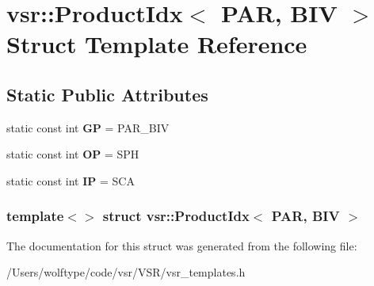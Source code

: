 \hypertarget{structvsr_1_1_product_idx_3_01_p_a_r_00_01_b_i_v_01_4}{\section{vsr\-:\-:Product\-Idx$<$ P\-A\-R, B\-I\-V $>$ Struct Template Reference}
\label{structvsr_1_1_product_idx_3_01_p_a_r_00_01_b_i_v_01_4}
}
\subsection*{Static Public Attributes}
\begin{DoxyCompactItemize}
\item 
\hypertarget{structvsr_1_1_product_idx_3_01_p_a_r_00_01_b_i_v_01_4_afad88fd347926194531077b879e67901}{static const int {\bfseries G\-P} = P\-A\-R\-\_\-\-B\-I\-V}\label{structvsr_1_1_product_idx_3_01_p_a_r_00_01_b_i_v_01_4_afad88fd347926194531077b879e67901}

\item 
\hypertarget{structvsr_1_1_product_idx_3_01_p_a_r_00_01_b_i_v_01_4_a21b4ef192774e806d08707426a80eb07}{static const int {\bfseries O\-P} = S\-P\-H}\label{structvsr_1_1_product_idx_3_01_p_a_r_00_01_b_i_v_01_4_a21b4ef192774e806d08707426a80eb07}

\item 
\hypertarget{structvsr_1_1_product_idx_3_01_p_a_r_00_01_b_i_v_01_4_a2157d9f949e2d5369cd8aa4b728452ba}{static const int {\bfseries I\-P} = S\-C\-A}\label{structvsr_1_1_product_idx_3_01_p_a_r_00_01_b_i_v_01_4_a2157d9f949e2d5369cd8aa4b728452ba}

\end{DoxyCompactItemize}
\subsubsection*{template$<$$>$ struct vsr\-::\-Product\-Idx$<$ P\-A\-R, B\-I\-V $>$}



The documentation for this struct was generated from the following file\-:\begin{DoxyCompactItemize}
\item 
/\-Users/wolftype/code/vsr/\-V\-S\-R/vsr\-\_\-templates.\-h\end{DoxyCompactItemize}
